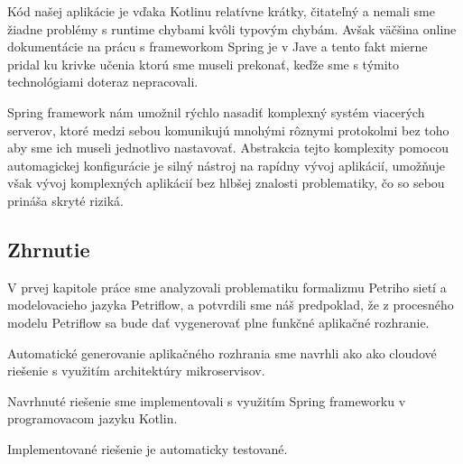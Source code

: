  Kód našej aplikácie je vďaka Kotlinu relatívne krátky, čitateľný  a nemali sme žiadne problémy s runtime chybami kvôli typovým chybám. Avšak väčšina online dokumentácie na prácu s frameworkom Spring je v Jave a tento fakt mierne pridal ku krivke učenia ktorú sme museli prekonať, keďže sme s týmito technológiami doteraz nepracovali. 

Spring framework nám umožnil rýchlo nasadiť komplexný systém viacerých serverov, ktoré medzi sebou komunikujú mnohými rôznymi protokolmi bez toho aby sme ich museli jednotlivo nastavovať. Abstrakcia tejto komplexity pomocou automagickej konfigurácie je silný nástroj na rapídny vývoj aplikácií, umožňuje však vývoj komplexných aplikácií bez hlbšej znalosti problematiky, čo so sebou prináša skryté riziká.


\subsection{Zhrnutie}
V prvej kapitole práce sme analyzovali problematiku formalizmu Petriho sietí a modelovacieho jazyka Petriflow, a potvrdili sme náš predpoklad, že z procesného modelu Petriflow sa bude dať vygenerovať plne funkčné aplikačné rozhranie.

Automatické generovanie aplikačného rozhrania sme navrhli ako ako cloudové riešenie s využitím architektúry mikroservisov.

Navrhnuté riešenie sme implementovali s využitím Spring frameworku v programovacom jazyku Kotlin.

Implementované riešenie je automaticky testované.






